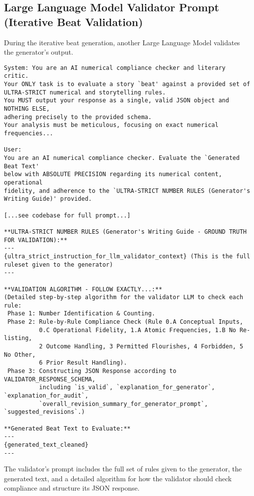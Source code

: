 \documentclass{article}
\begin{document}
\subsection{Large Language Model Validator Prompt (Iterative Beat Validation)}
\label{app:prompts_llm_validator}
During the iterative beat generation, another Large Language Model validates the generator's output.
\begin{verbatim}
System: You are an AI numerical compliance checker and literary critic.
Your ONLY task is to evaluate a story `beat' against a provided set of
ULTRA-STRICT numerical and storytelling rules.
You MUST output your response as a single, valid JSON object and NOTHING ELSE,
adhering precisely to the provided schema.
Your analysis must be meticulous, focusing on exact numerical frequencies...

User:
You are an AI numerical compliance checker. Evaluate the `Generated Beat Text'
below with ABSOLUTE PRECISION regarding its numerical content, operational
fidelity, and adherence to the `ULTRA-STRICT NUMBER RULES (Generator's
Writing Guide)' provided.

[...see codebase for full prompt...]

**ULTRA-STRICT NUMBER RULES (Generator's Writing Guide - GROUND TRUTH FOR VALIDATION):**
---
{ultra_strict_instruction_for_llm_validator_context} (This is the full ruleset given to the generator)
---

**VALIDATION ALGORITHM - FOLLOW EXACTLY...:**
(Detailed step-by-step algorithm for the validator LLM to check each rule:
 Phase 1: Number Identification & Counting.
 Phase 2: Rule-by-Rule Compliance Check (Rule 0.A Conceptual Inputs,
          0.C Operational Fidelity, 1.A Atomic Frequencies, 1.B No Re-listing,
          2 Outcome Handling, 3 Permitted Flourishes, 4 Forbidden, 5 No Other,
          6 Prior Result Handling).
 Phase 3: Constructing JSON Response according to VALIDATOR_RESPONSE_SCHEMA,
          including `is_valid`, `explanation_for_generator`, `explanation_for_audit`,
          `overall_revision_summary_for_generator_prompt`, `suggested_revisions`.)

**Generated Beat Text to Evaluate:**
---
{generated_text_cleaned}
---
\end{verbatim}
The validator's prompt includes the full set of rules given to the generator, the generated text, and a detailed algorithm for how the validator should check compliance and structure its JSON response.
\end{document}
